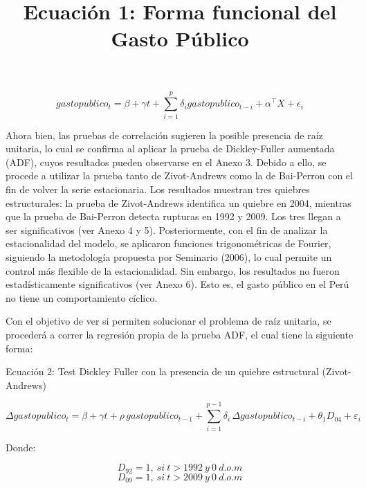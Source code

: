 \documentclass[12pt]{article}
\begin{document}
\begin{center}
\title{Ecuación 1: Forma funcional del Gasto Público}
\end{center}
\begin{equation}
gastopublico_{t}= \beta + \gamma t + \sum_{i=1}^{p} \delta_{i}gastopublico_{t-i} + \alpha^{\top} X + \epsilon_{i}
\end{equation}

Ahora bien, las pruebas de correlación sugieren la posible presencia de raíz unitaria, lo cual se confirma al aplicar la prueba de Dickley-Fuller aumentada (ADF), cuyos resultados pueden observarse en el Anexo 3. Debido a ello, se procede a utilizar la prueba tanto de Zivot-Andrews como la de Bai-Perron con el fin de volver la serie estacionaria. Los resultados muestran tres quiebres estructurales: la prueba de Zivot-Andrews identifica un quiebre en 2004, mientras que la prueba de Bai-Perron detecta rupturas en 1992 y 2009. Los tres llegan a ser significativos (ver Anexo 4 y 5). Posteriormente, con el fin de analizar la estacionalidad del modelo, se aplicaron funciones trigonométricas de Fourier, siguiendo la metodología propuesta por Seminario (2006), lo cual permite un control más flexible de la estacionalidad. Sin embargo, los resultados no fueron estadísticamente significativos (ver Anexo 6). Esto es, el gasto público en el Perú no tiene un comportamiento cíclico. 

Con el objetivo de ver si permiten solucionar el problema de raíz unitaria, se procederá a correr la regresión propia de la prueba ADF, el cual tiene la siguiente forma: 

\begin{center}
Ecuación 2: Test Dickley Fuller con la presencia de un quiebre estructural (Zivot-Andrews)    
\end{center}
\begin{equation}
\Delta gastopublic{o}_{t} = \beta + \gamma t + \rho \, gastopublic{o}_{t-1} + \sum_{i=1}^{p-1} \delta_{i} \, \Delta gastopublic{o}_{t-i} + \theta_{1} D_{04} + \varepsilon_{i}
\end{equation}
\begin{center}
Donde: 
\end{center}
\begin{equation*}
D_{92}=1,\ si\ t>1992\ y\ 0\ d.o.m
\end{equation*}
\begin{equation*}
D_{09}=1,\ si\ t>2009\ y\ 0\ d.o.m
\end{equation*}
\end{document}
